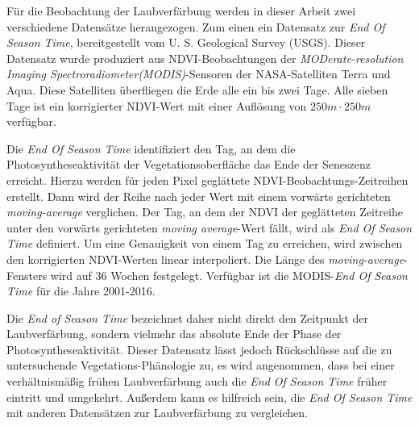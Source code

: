 \documentclass{article}
\begin{document}
Für die Beobachtung der Laubverfärbung werden in dieser Arbeit zwei verschiedene Datensätze herangezogen. Zum einen ein Datensatz zur \textit{End Of Season Time}, bereitgestellt vom U. S. Geological Survey (USGS). Dieser Datensatz wurde produziert aus NDVI-Beobachtungen der \textit{MODerate-resolution Imaging Spectroradiometer(MODIS)}-Sensoren der NASA-Satelliten Terra und Aqua. Diese Satelliten überfliegen die Erde alle ein bis zwei Tage. Alle sieben Tage ist ein korrigierter NDVI-Wert mit einer Auflösung von $250m \cdot 250m$ verfügbar.

Die \textit{End Of Season Time} identifiziert den Tag, an dem die Photosyntheseaktivität der Vegetationsoberfläche das Ende der Seneszenz erreicht. Hierzu werden für jeden Pixel geglättete NDVI-Beobachtungs-Zeitreihen erstellt. Dann wird der Reihe nach jeder Wert mit einem vorwärts gerichteten \textit{moving-average} verglichen. Der Tag, an dem der NDVI der geglätteten Zeitreihe unter den vorwärts gerichteten \textit{moving average}-Wert fällt, wird als \textit{End Of Season Time} definiert. Um eine Genauigkeit von einem Tag zu erreichen, wird zwischen den korrigierten NDVI-Werten linear interpoliert. Die Länge des \textit{moving-average}-Fensters wird auf 36 Wochen festgelegt. Verfügbar ist die MODIS-\textit{End Of Season Time} für die Jahre 2001-2016.

Die \textit{End of Season Time} bezeichnet daher nicht direkt den Zeitpunkt der Laubverfärbung, sondern vielmehr das absolute Ende der Phase der Photosyntheseaktivität. Dieser Datensatz lässt jedoch Rückschlüsse auf die zu untersuchende Vegetations-Phänologie zu, es wird angenommen, dass bei einer verhältnismäßig frühen Laubverfärbung auch die \textit{End Of Season Time} früher eintritt und umgekehrt. Außerdem kann es hilfreich sein, die \textit{End Of Season Time} mit anderen Datensätzen zur Laubverfärbung zu vergleichen.
\end{document}

